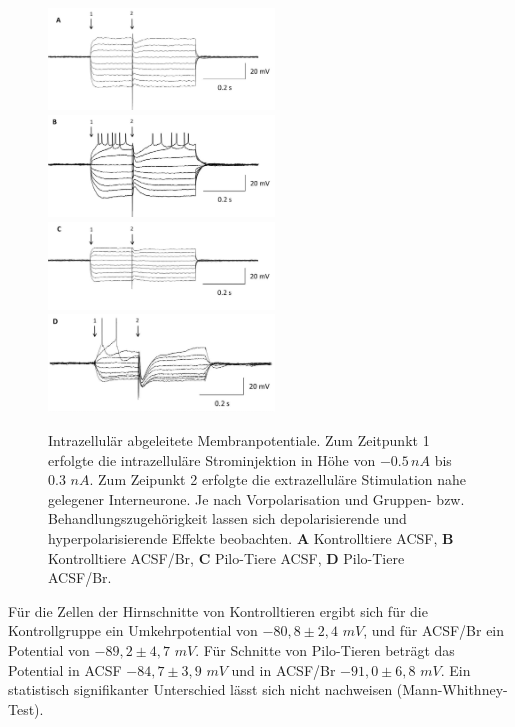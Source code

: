 \documentclass[a4paper,11pt]{report}
\begin{document}
{\begin{figure} [H]
\begin{center}
\includegraphics[width=6cm]{Abbildungen/egaba/egaba_k_c_sample}
\includegraphics[width=6cm]{Abbildungen/egaba/egaba_k_br_sample}
\includegraphics[width=6cm]{Abbildungen/egaba/egaba_p_c_sample}
\includegraphics[width=6cm]{Abbildungen/egaba/egaba_p_br_sample}
\caption{Intrazellulär abgeleitete Membranpotentiale. Zum Zeitpunkt 1 erfolgte die intrazelluläre Strominjektion in Höhe von $-0.5\, nA$ bis $0.3$ $nA$. Zum Zeipunkt 2 erfolgte die extrazelluläre Stimulation nahe gelegener Interneurone. Je nach Vorpolarisation und Gruppen- bzw. Behandlungszugehörigkeit lassen sich depolarisierende und hyperpolarisierende Effekte beobachten. \textbf{A} Kontrolltiere ACSF, \textbf{B} Kontrolltiere ACSF/Br, \textbf{C} Pilo-Tiere ACSF, \textbf{D} Pilo-Tiere ACSF/Br.}
\end{center}
\end{figure}

Für die Zellen der Hirnschnitte von Kontrolltieren ergibt sich für die Kontrollgruppe ein Umkehrpotential von $-80,8 \pm 2,4$ $mV$, und für ACSF/Br ein Potential von $-89,2 \pm 4,7$ $mV$. Für Schnitte von Pilo-Tieren beträgt das Potential in ACSF $-84,7 \pm 3,9$ $mV$ und in ACSF/Br $-91,0 \pm 6,8$ $mV$. Ein statistisch signifikanter Unterschied lässt sich nicht nachweisen (Mann-Whithney-Test).

}
\end{document}
